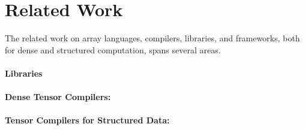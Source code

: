\section{Related Work}

The related work on array languages, compilers, libraries, and frameworks, both for dense and structured computation, spans several areas.

\paragraph{Libraries}

\paragraph{Dense Tensor Compilers:}

\paragraph{Tensor Compilers for Structured Data:}




